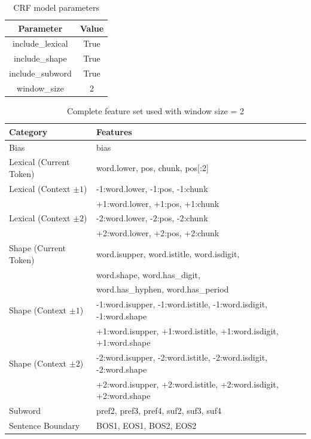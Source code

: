 \documentclass{report}
\begin{document}
\begin{table}[h]
    \centering
    \begin{tabular}{cc}
        \hline
        Parameter & Value \\
        \hline
        include\_lexical & True \\
        include\_shape & True \\
        include\_subword & True \\
        window\_size & 2 \\
        \hline
    \end{tabular}
    \caption{CRF model parameters}
\end{table}

\begin{table}[h]
\centering
\small
\begin{tabular}{ll}
\hline
\textbf{Category} & \textbf{Features} \\
\hline

Bias & bias \\

\hline
Lexical (Current Token) &
word.lower, pos, chunk, pos[:2] \\

\hline
Lexical (Context $\pm 1$) &
-1:word.lower, -1:pos, -1:chunk \\
&
+1:word.lower, +1:pos, +1:chunk \\

\hline
Lexical (Context $\pm 2$) &
-2:word.lower, -2:pos, -2:chunk \\
&
+2:word.lower, +2:pos, +2:chunk \\

\hline
Shape (Current Token) &
word.isupper, word.istitle, word.isdigit, \\
&
word.shape, word.has\_digit, \\
&
word.has\_hyphen, word.has\_period \\

\hline
Shape (Context $\pm 1$) &
-1:word.isupper, -1:word.istitle, -1:word.isdigit, -1:word.shape \\
&
+1:word.isupper, +1:word.istitle, +1:word.isdigit, +1:word.shape \\

\hline
Shape (Context $\pm 2$) &
-2:word.isupper, -2:word.istitle, -2:word.isdigit, -2:word.shape \\
&
+2:word.isupper, +2:word.istitle, +2:word.isdigit, +2:word.shape \\

\hline
Subword &
pref2, pref3, pref4, suf2, suf3, suf4 \\

\hline
Sentence Boundary &
BOS1, EOS1, BOS2, EOS2 \\

\hline
\end{tabular}
\caption{Complete feature set used with window size = 2}
\end{table}
\end{document}
